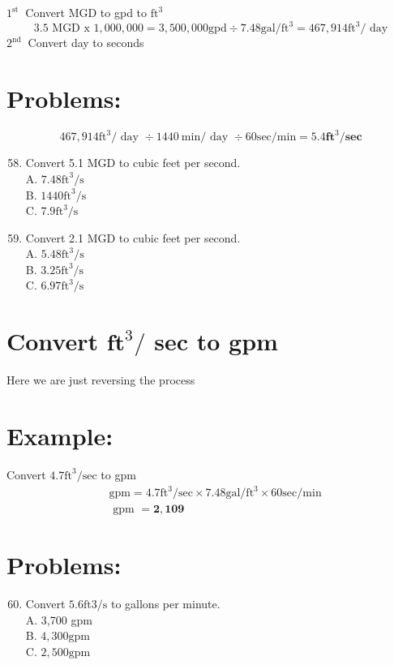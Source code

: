 \begin{enumerate}
$1^{\text {st }}$ Convert MGD to gpd to $\mathrm{ft}^{3}$
$$
\text { 3.5 MGD x } 1,000,000=3,500,000 \mathrm{gpd} \div 7.48 \mathrm{gal} / \mathrm{ft}^{3}=467,914 \mathrm{ft}^{3} / \text { day }
$$
$2^{\text {nd }}$ Convert day to seconds

\section{Problems:}
$$
467,914 \mathrm{ft}^{3} / \text { day } \div 1440 \mathrm{~min} / \text { day } \div 60 \mathrm{sec} / \mathrm{min}=5.4 \mathbf{f t}^{3} / \mathbf{s e c}
$$

\begin{enumerate}
  \setcounter{enumi}{57}
  \item Convert 5.1 MGD to cubic feet per second.\\
A. $7.48 \mathrm{ft}^{3} / \mathrm{s}$\\
B. $1440 \mathrm{ft}^{3} / \mathrm{s}$\\
C. $7.9 \mathrm{ft}^{3} / \mathrm{s}$

  \item Convert 2.1 MGD to cubic feet per second.\\
A. $5.48 \mathrm{ft}^{3} / \mathrm{s}$\\
B. $3.25 \mathrm{ft}^{3} / \mathrm{s}$\\
C. $6.97 \mathrm{ft}^{3} / \mathrm{s}$

\end{enumerate}
\section{Convert $\mathbf{f t}^{3} /$ sec to gpm}
Here we are just reversing the process

\section{Example:}
Convert $4.7 \mathrm{ft}^{3} / \mathrm{sec}$ to gpm
$$
\begin{aligned}
&\mathrm{gpm}=4.7 \mathrm{ft}^{3} / \mathrm{sec} \times 7.48 \mathrm{gal} / \mathrm{ft}^{3} \times 60 \mathrm{sec} / \mathrm{min} \\
&\text { gpm }=\mathbf{2 , 1 0 9}
\end{aligned}
$$

\section{Problems:}
\begin{enumerate}
  \setcounter{enumi}{59}
  \item Convert $5.6 \mathrm{ft} 3 / \mathrm{s}$ to gallons per minute.\\
A. 3,700 gpm\\
B. $4,300 \mathrm{gpm}$\\
C. $2,500 \mathrm{gpm}$


\end{enumerate}
\end{enumerate}
